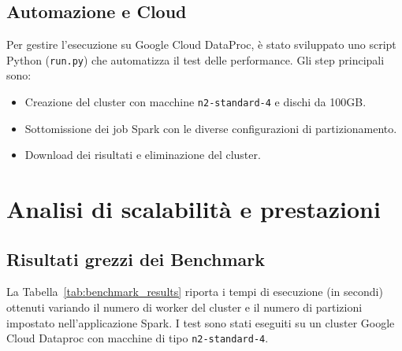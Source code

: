 \documentclass{article}
\begin{document}
\subsection{Automazione e Cloud}
Per gestire l'esecuzione su Google Cloud DataProc, è stato sviluppato uno script Python (\texttt{run.py}) che automatizza il test delle performance. Gli step principali sono:
\begin{itemize}
  \item Creazione del cluster con macchine \texttt{n2-standard-4} e dischi da 100GB.
  \item Sottomissione dei job Spark con le diverse configurazioni di partizionamento.
  \item Download dei risultati e eliminazione del cluster.
\end{itemize}


% 

\section{Analisi di scalabilità e prestazioni}

\subsection{Risultati grezzi dei Benchmark}

La Tabella~\ref{tab:benchmark_results} riporta i tempi di esecuzione (in secondi) ottenuti variando il numero di worker del cluster e il numero di partizioni impostato nell'applicazione Spark. I test sono stati eseguiti su un cluster Google Cloud Dataproc con macchine di tipo \texttt{n2-standard-4}.
\end{document}
